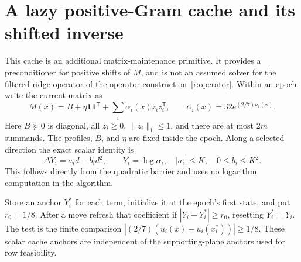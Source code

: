 \documentclass[11pt]{amsart}
\theoremstyle{definition}\newtheorem{definition}[theorem]{Definition}
\theoremstyle{remark}\newtheorem{remark}[theorem]{Remark}
\numberwithin{equation}{section}
\begin{document}
\section{A lazy positive-Gram cache and its shifted inverse}\label{new:lazy}
\label{m:sec:cache}
This cache is an additional matrix-maintenance primitive. It provides a
preconditioner for positive shifts of $M$, and is not an assumed solver
for the filtered-ridge operator of the operator construction~\ref{r:operator}.
Within an epoch write the current matrix as
\begin{equation}
 M(x)=B+\eta\mathbf1\mathbf1^{\mathsf T}
                +\sum_i\alpha_i(x)z_iz_i^{\mathsf T},
 \qquad \alpha_i(x)=32e^{(2/7)u_i(x)}.                     \label{m:eq:cache-gram}
\end{equation}
Here $B\succeq0$ is diagonal, all $z_i\ge0$, $\|z_i\|_1\le1$, and
there are at most $2m$ summands. The profiles, $B$, and $\eta$ are fixed
inside the epoch. Along a selected direction the exact scalar identity is
\begin{equation}
 \Delta Y_i=a_id-b_id^2,\qquad Y_i=\log\alpha_i,
 \quad |a_i|\le K,\quad 0\le b_i\le K^2.                 \label{m:eq:log-increment}
\end{equation}
This follows directly from the quadratic barrier and uses no logarithm
computation in the algorithm.

Store an anchor $Y_i^*$ for each term, initialize it at the epoch's first
state, and put $r_0=1/8$. After a move refresh that coefficient if
$|Y_i-Y_i^*|\ge r_0$, resetting $Y_i^*=Y_i$.
The test is the finite comparison
$|(2/7)(u_i(x)-u_i(x_i^*))|\ge1/8$.
These scalar cache anchors are independent of the supporting-plane
anchors used for row feasibility.
\end{document}
